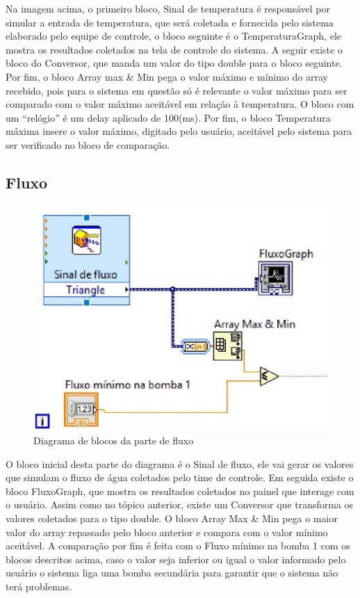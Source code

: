  Na imagem acima, o primeiro bloco, Sinal de temperatura é responsável por simular a entrada de temperatura, que será coletada e fornecida pelo sistema elaborado pelo equipe de controle, o bloco seguinte é o TemperaturaGraph, ele mostra os resultados coletados na tela de controle do sistema. A seguir existe o bloco do Conversor, que manda um valor do tipo double para o bloco seguinte. Por fim, o bloco Array max \& Min pega o valor máximo e mínimo do array recebido, pois para o sistema em questão só é relevante o valor máximo para ser comparado com o valor máximo aceitável em relação à temperatura.
O bloco com um “relógio” é um delay aplicado de 100(ms). Por fim, o bloco Temperatura máxima insere o valor máximo, digitado pelo usuário, aceitável pelo sistema para ser verificado no bloco de comparação.

\subsection{Fluxo}


\begin{figure}[!htb]                                                               
    \centering                                                                      
    \includegraphics[scale=0.6, keepaspectratio=true]{figuras/detalhado/flux.eps} 
    \caption{Diagrama de blocos da parte de fluxo}
 \end{figure}

O bloco inicial desta parte do diagrama é o Sinal de fluxo, ele vai gerar os valores que simulam o fluxo de água coletados pelo time de controle. Em seguida existe o bloco FluxoGraph, que mostra os resultados coletados no painel que interage com o usuário.
    Assim como no tópico anterior, existe um Conversor que transforma os valores coletados para o tipo double. O bloco  Array Max \& Min pega o maior valor do array repassado pelo bloco anterior e compara com o valor mínimo aceitável.
    A comparação por fim é feita com o Fluxo mínimo na bomba 1 com os blocos descritos acima, caso o valor seja inferior ou igual o valor informado pelo usuário o sistema liga uma bomba secundária para garantir que o sistema não terá problemas.

